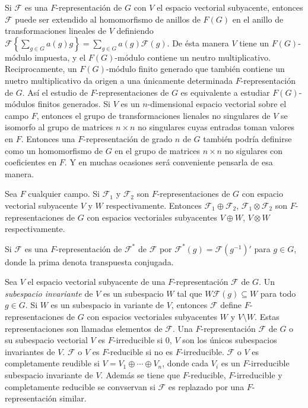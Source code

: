 \documentclass[12pt]{book}
\theoremstyle{definition}
\newcounter{in}
\newcounter{ini}
\begin{document}
Si $\mathcal{F}$ es una $F$-representación de $G$ con $V$ el espacio
vectorial subyacente, entonces $\mathcal{F}$ puede ser extendido al
homomorfismo de anillos de $F(G)$ en el anillo de transformaciones
lineales de $V$ definiendo
$\mathcal{F} \left\{ \sum_{g \in G} a(g)g \right\} = \sum_{g \in G}
a(g) \mathcal{F}(g) $. De ésta manera $V$ tiene un $F(G)$-módulo
impuesta, y el $F(G)$-módulo contiene un neutro
multiplicativo. Reciprocamente, un $F(G)$-módulo finito generado que
también contiene un nuetro multiplicativo da origen a una únicamente
determinada $F$-representación de $G$. Así el estudio de
$F$-representaciones de $G$ es equivalente a estudiar $F(G)$-módulos
finitos generados.  Si $V$ es un $n$-dimensional espacio vectorial
sobre el campo $F$, entonces el grupo de transformaciones lienales no
singulares de $V$ se isomorfo al grupo de matrices $n \times n$ no
singulares cuyas entradas toman valores en $F$. Entonces una
$F$-representación de grado $n$ de $G$ también podría definirse como
un homomorfismo de $G$ en el grupo de matrices $n \times n$ no
sigulares con coeficientes en $F$. Y en muchas ocasiones será
conveniente pensarla de esa manera.

Sea $F$ cualquier campo. Si $\mathcal{F}_{1}$ y $\mathcal{F}_{2}$ son
$F$-representaciones de $G$ con espacio vectorial subyacente $V$ y $W$
respectivamente. Entonces $\mathcal{F}_{1} \oplus \mathcal{F}_{2}$,
$\mathcal{F}_{1} \otimes \mathcal{F}_{2}$ son $F$-representaciones de
$G$ con espacios vectoriales subyacentes $V \oplus W$, $V \otimes W$
respectivamente.

Si $\mathcal{F}$ es una $F$-representación de $\mathcal{F}^{*}$ de
$\mathcal{F}$ por $\mathcal{F}^{*}(g)=\mathcal{F}(g^{-1})'$ para
$g \in G$, donde la prima denota transpuesta conjugada.

Sea $V$ el espacio vectorial subyacente de una $F$-representación
$\mathcal{F}$ de $G$. Un \emph{subespacio invariante} de $V$ es un
subespacio $W$ tal que $W \mathcal{F}(g) \subseteq W $ para todo
$g \in G$. Si $W$ es un subespacio in variante de $V$, entonces
$\mathcal{F}$ define $F$-representaciones de $G$ con espacios
vectoriales subyacentes $W$ y $V \setminus W$. Estas representaciones
son llamadas elementos de $\mathcal{F}$. Una $F$-representación
$\mathcal{F}$ de $G$ o su subespacio vectorial $V$ es $F$-irreducible
si $0$, $V$ son los únicos subespacios invariantes de
$V$. $\mathcal{F}$ o $V$ es $F$-reducible si no es
$F$-irreducible. $\mathcal{F}$ o $V$ es completamente reudible si
$V = V_{1} \oplus \cdots \oplus V_{n}$, donde cada $V_{i}$ es un
$F$-irreducible subespacio invariante de $V$. Además se tiene que
$F$-reducible, $F$-irreducible y completamente reducible se convservan
si $\mathcal{F}$ es replazado por una $F$-representación similar.
\end{document}

